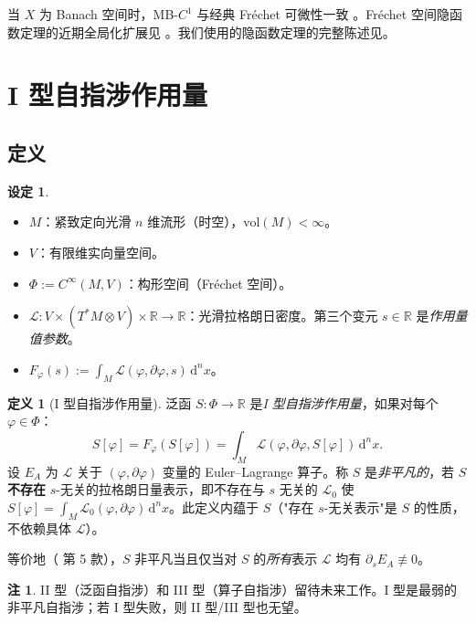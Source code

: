 \documentclass[12pt,a4paper]{article}
\theoremstyle{definition}
\newtheorem{definition}[theorem]{定义}
\newtheorem{remark}[theorem]{注}
\newtheorem{setup}[theorem]{设定}
\newcommand{\mL}{\mathcal{L}}
\newcommand{\mPhi}{\Phi}
\newcommand{\vol}{\mathrm{vol}}
\newcommand{\R}{\mathbb{R}}
\newcommand{\diff}{\mathrm{d}}
\newcommand{\dVol}{\,\diff^n x}
\begin{document}
当 $X$ 为 Banach 空间时，MB-$C^1$ 与经典 Fr\'echet 可微性一致 \cite{Hamilton1982, Glockner2006}。Fr\'echet 空间隐函数定理的近期全局化扩展见 \cite{Eftekharinasab2024}。我们使用的隐函数定理的完整陈述见。

\section{I 型自指涉作用量}
\label{sec:def}

\subsection{定义}

\begin{setup}
\label{setup:basic}
\leavevmode
\begin{itemize}
\item $M$：紧致定向光滑 $n$ 维流形（时空），$\vol(M) < \infty$。
\item $V$：有限维实向量空间。
\item $\mPhi := C^\infty(M, V)$：构形空间（Fr\'echet 空间）。
\item $\mL: V \times (T^*M \otimes V) \times \R \to \R$：光滑拉格朗日密度。第三个变元 $s \in \R$ 是\emph{作用量值参数}。
\item $F_\varphi(s) := \int_M \mL(\varphi, \partial\varphi, s) \dVol$。
\end{itemize}
\end{setup}

\begin{definition}[I 型自指涉作用量]
\label{def:typeI}
泛函 $S: \mPhi \to \R$ 是\emph{I 型自指涉作用量}，如果对每个 $\varphi \in \mPhi$：
\[ S[\varphi] = F_\varphi(S[\varphi]) = \int_M \mL(\varphi, \partial\varphi, S[\varphi]) \dVol. \]
设 $E_A$ 为 $\mL$ 关于 $(\varphi, \partial\varphi)$ 变量的 Euler--Lagrange 算子。称 $S$ 是\emph{非平凡的}，若 $S$ \textbf{不存在} $s$-无关的拉格朗日量表示，即不存在与 $s$ 无关的 $\mL_0$ 使 $S[\varphi] = \int_M \mL_0(\varphi, \partial\varphi) \dVol$。此定义内蕴于 $S$（"存在 $s$-无关表示"是 $S$ 的性质，不依赖具体 $\mL$）。

等价地（ 第 5 款），$S$ 非平凡当且仅当对 $S$ 的\emph{所有}表示 $\mL$ 均有 $\partial_s E_A \not\equiv 0$。
\end{definition}

\begin{remark}
II 型（泛函自指涉）和 III 型（算子自指涉）留待未来工作。I 型是最弱的非平凡自指涉；若 I 型失败，则 II 型/III 型也无望。
\end{remark}
\end{document}
